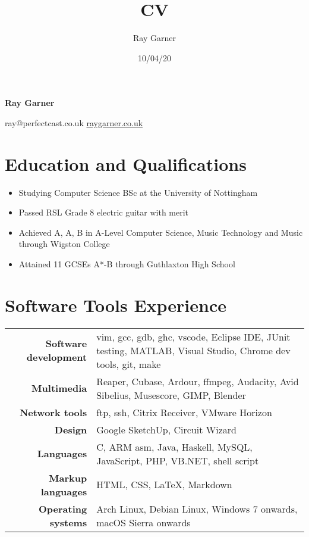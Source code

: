 \documentclass{article}
\title{CV}
\date{10/04/20}
\author{Ray Garner}
\makeatletter
\renewcommand{\maketitle}{
\vskip -5cm
\begin{center}


{\huge\bfseries
Ray Garner}

\vskip 0.25cm

{\large
ray@perfectcast.co.uk\hspace{0.5cm}
\href{https://www.raygarner.co.uk}{raygarner.co.uk}}

\vskip 1cm

\end{center}
}
\makeatother
\begin{document}
\maketitle

\section{Education and Qualifications}

\begin{itemize}[noitemsep]

\renewcommand{\labelitemi}{$\square$}
\item Studying Computer Science BSc at the University of Nottingham
\item Passed RSL Grade 8 electric guitar with merit
\item Achieved A, A, B in A-Level Computer Science, Music Technology and Music through Wigston College
\item Attained 11 GCSEs A*-B through Guthlaxton High School

\end{itemize}

\section{Software Tools Experience}

\renewcommand{\arraystretch}{1.4}

\begin{tabular}{ r | p{11cm} }

{\large\bfseries Software development} & {vim, gcc, gdb, ghc, vscode, Eclipse IDE, JUnit testing, MATLAB, Visual Studio, Chrome dev tools, git, make}\\
{\large\bfseries Multimedia} & {Reaper, Cubase, Ardour, ffmpeg, Audacity, Avid Sibelius, Musescore, GIMP, Blender} \\
{\large\bfseries Network tools} & {ftp, ssh, Citrix Receiver, VMware Horizon} \\
{\large\bfseries Design} & {Google SketchUp, Circuit Wizard} \\
{\large\bfseries Languages} & {C, ARM asm, Java, Haskell, MySQL, JavaScript, PHP, VB.NET, shell script}\\
{\large\bfseries Markup languages} & {HTML, CSS, \LaTeX, Markdown}\\
{\large\bfseries Operating systems} & {Arch Linux, Debian Linux, Windows 7 onwards, macOS Sierra onwards}\\
\end{tabular}
\end{document}
